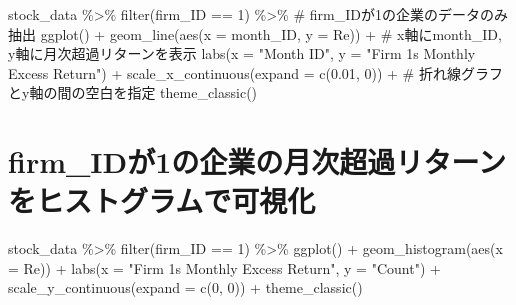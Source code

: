 \documentclass[
  letterpaper,
  DIV=11,
  numbers=noendperiod]{scrreprt}
\newenvironment{Shaded}{\begin{snugshade}}{\end{snugshade}}
\newcommand{\AttributeTok}[1]{\textcolor[rgb]{0.40,0.45,0.13}{#1}}
\newcommand{\CommentTok}[1]{\textcolor[rgb]{0.37,0.37,0.37}{#1}}
\newcommand{\DecValTok}[1]{\textcolor[rgb]{0.68,0.00,0.00}{#1}}
\newcommand{\FloatTok}[1]{\textcolor[rgb]{0.68,0.00,0.00}{#1}}
\newcommand{\FunctionTok}[1]{\textcolor[rgb]{0.28,0.35,0.67}{#1}}
\newcommand{\NormalTok}[1]{\textcolor[rgb]{0.00,0.23,0.31}{#1}}
\newcommand{\SpecialCharTok}[1]{\textcolor[rgb]{0.37,0.37,0.37}{#1}}
\newcommand{\StringTok}[1]{\textcolor[rgb]{0.13,0.47,0.30}{#1}}
\begin{document}
\begin{Shaded}
\begin{Highlighting}[]
\NormalTok{stock\_data }\SpecialCharTok{\%\textgreater{}\%}
  \FunctionTok{filter}\NormalTok{(firm\_ID }\SpecialCharTok{==} \DecValTok{1}\NormalTok{) }\SpecialCharTok{\%\textgreater{}\%} \CommentTok{\# firm\_IDが1の企業のデータのみ抽出}
  \FunctionTok{ggplot}\NormalTok{() }\SpecialCharTok{+} 
  \FunctionTok{geom\_line}\NormalTok{(}\FunctionTok{aes}\NormalTok{(}\AttributeTok{x =}\NormalTok{ month\_ID, }\AttributeTok{y =}\NormalTok{ Re)) }\SpecialCharTok{+} \CommentTok{\# x軸にmonth\_ID, y軸に月次超過リターンを表示}
  \FunctionTok{labs}\NormalTok{(}\AttributeTok{x =} \StringTok{"Month ID"}\NormalTok{, }\AttributeTok{y =} \StringTok{"Firm 1\textquotesingle{}s Monthly Excess Return"}\NormalTok{) }\SpecialCharTok{+} 
  \FunctionTok{scale\_x\_continuous}\NormalTok{(}\AttributeTok{expand =} \FunctionTok{c}\NormalTok{(}\FloatTok{0.01}\NormalTok{, }\DecValTok{0}\NormalTok{)) }\SpecialCharTok{+} \CommentTok{\# 折れ線グラフとy軸の間の空白を指定}
  \FunctionTok{theme\_classic}\NormalTok{()}
\end{Highlighting}
\end{Shaded}

\section{firm\_IDが1の企業の月次超過リターンをヒストグラムで可視化}\label{firm_idux304c1ux306eux4f01ux696dux306eux6708ux6b21ux8d85ux904eux30eaux30bfux30fcux30f3ux3092ux30d2ux30b9ux30c8ux30b0ux30e9ux30e0ux3067ux53efux8996ux5316}

\begin{Shaded}
\begin{Highlighting}[]
\NormalTok{stock\_data }\SpecialCharTok{\%\textgreater{}\%}
  \FunctionTok{filter}\NormalTok{(firm\_ID }\SpecialCharTok{==} \DecValTok{1}\NormalTok{) }\SpecialCharTok{\%\textgreater{}\%} 
  \FunctionTok{ggplot}\NormalTok{() }\SpecialCharTok{+} 
  \FunctionTok{geom\_histogram}\NormalTok{(}\FunctionTok{aes}\NormalTok{(}\AttributeTok{x =}\NormalTok{ Re)) }\SpecialCharTok{+} 
  \FunctionTok{labs}\NormalTok{(}\AttributeTok{x =} \StringTok{"Firm 1\textquotesingle{}s Monthly Excess Return"}\NormalTok{, }\AttributeTok{y =} \StringTok{"Count"}\NormalTok{) }\SpecialCharTok{+}
  \FunctionTok{scale\_y\_continuous}\NormalTok{(}\AttributeTok{expand =} \FunctionTok{c}\NormalTok{(}\DecValTok{0}\NormalTok{, }\DecValTok{0}\NormalTok{)) }\SpecialCharTok{+} 
  \FunctionTok{theme\_classic}\NormalTok{()}
\end{Highlighting}
\end{Shaded}
\end{document}
